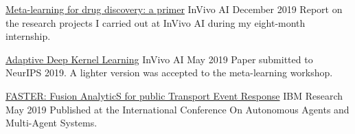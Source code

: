 


    


\begin{cvpublications}

    \cvpublication
    {\href{https://github.com/bdura/invivo-report/raw/report/InVivo AI Report.pdf}{Meta-learning for drug discovery: a primer} \acvHeaderIconSep\faLink} %
    {InVivo AI} %
    {December 2019} %
    {
      Report on the research projects I carried out at InVivo AI during my eight-month internship.
    }
    
    \cvpublication
    {\href{https://arxiv.org/pdf/1905.12131.pdf}{Adaptive Deep Kernel Learning} \acvHeaderIconSep\faLink} %
    {InVivo AI} %
    {May 2019} %
    {
      Paper submitted to NeurIPS 2019. A lighter version was accepted to the meta-learning workshop.
    }
    
    \cvpublication
    {\href{https://arxiv.org/pdf/1906.03040.pdf}{FASTER: Fusion AnalyticS for public Transport Event Response} \acvHeaderIconSep\faLink} %
    {IBM Research} %
    {May 2019} %
    {
      Published at the International Conference On Autonomous Agents and Multi-Agent Systems.
    }

\end{cvpublications}


